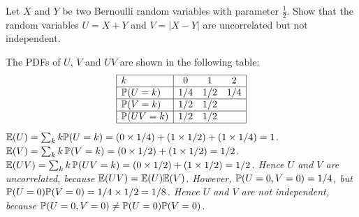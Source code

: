 \begin{exercise}
\begin{questions}
\question
Let $X$ and $Y$ be two Bernoulli random variables with parameter $\frac{1}{2}$. Show that the random variables $U=X+Y$ and $V=|X-Y|$ are uncorrelated but not independent.
\begin{answer}
The PDFs of $U$, $V$ and $UV$ are shown in the following table:
\[
\begin{array}{|l|ccc|}\hline
k				& 0		& 1		& 2	\\ \hline
\mathbb{P}(U=k)		& 1/4	& 1/2	& 1/4	\\ \hline
\mathbb{P}(V=k)		& 1/2	& 1/2	& \\ \hline
\mathbb{P}(UV=k) 		& 1/2	& 1/2	& \\ \hline
\end{array}
\]
\bit
\it $\mathbb{E}(U) = \sum_k k\mathbb{P}(U=k) = \left(0\times 1/4\right) + \left(1\times 1/2\right) + \left(1\times 1/4\right) = 1$.
\it $\mathbb{E}(V) = \sum_k k\,\mathbb{P}(V=k) = \left(0\times 1/2\right) + \left(1\times 1/2\right) = 1/2$.
\it $\mathbb{E}(UV) = \sum_k k\,\mathbb{P}(UV=k) = \left(0\times 1/2\right) + \left(1\times 1/2\right) = 1/2$.
\eit
Hence $U$ and $V$ are uncorrelated, because $\mathbb{E}(UV)=\mathbb{E}(U)\mathbb{E}(V)$. However, 
\bit
\it $\mathbb{P}(U=0,V=0) = 1/4$, but 
\it $\mathbb{P}(U=0)\mathbb{P}(V=0) = 1/4 \times 1/2 = 1/8$.
\eit
Hence $U$ and $V$ are not independent, because $\mathbb{P}(U=0,V=0)\neq\mathbb{P}(U=0)\mathbb{P}(V=0)$.
\end{answer}


\end{questions}
\end{exercise}
